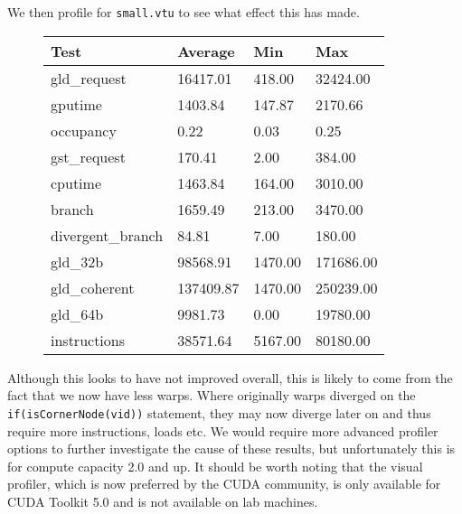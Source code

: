 We then profile for \texttt{small.vtu} to see what effect this has made.\\
\begin{figure}[H]\centering \begin{tabular}{ l | l | l | l}
\hline
Test & Average & Min & Max \\
\hline
\hline
gld\_request & 16417.01 & 418.00 & 32424.00 \\
gputime & 1403.84 & 147.87 & 2170.66 \\
occupancy & 0.22 & 0.03 & 0.25 \\
gst\_request & 170.41 & 2.00 & 384.00 \\
cputime & 1463.84 & 164.00 & 3010.00 \\
branch & 1659.49 & 213.00 & 3470.00 \\
divergent\_branch & 84.81 & 7.00 & 180.00 \\
gld\_32b & 98568.91 & 1470.00 & 171686.00 \\
gld\_coherent & 137409.87 & 1470.00 & 250239.00 \\
gld\_64b & 9981.73 & 0.00 & 19780.00 \\
instructions & 38571.64 & 5167.00 & 80180.00 \\
\hline
\end{tabular} \end{figure}

Although this looks to have not improved overall, this is likely to come from the fact that we now have less warps. Where originally warps diverged on the \verb!if(isCornerNode(vid))! statement, they may now diverge later on and thus require more instructions, loads etc.
We would require more advanced profiler options to further investigate the cause of these results, but unfortunately this is for compute capacity 2.0 and up. It should be worth noting that the visual profiler, which is now preferred by the CUDA community, is only available for CUDA Toolkit 5.0 and is not available on lab machines.